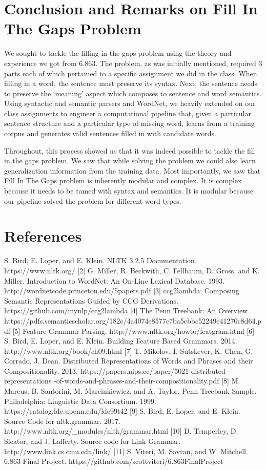 \documentclass{article}[12pt]
\theoremstyle{definition}
\begin{document}
\section{Conclusion and Remarks on Fill In The Gaps Problem}

We sought to tackle the filling in the gaps problem using the theory and experience we got from 6.863. The problem, as was initially mentioned, required 3 parts each of which pertained to a specific assignment we did in the class. When filling in a word, the sentence must preserve its syntax. Next, the sentence needs to preserve the `meaning' aspect which composes to sentence and word semantics. Using syntactic and semantic parsers and WordNet, we heavily extended on our class assignments to engineer a computational pipeline that, given a particular sentence structure and a particular type of missing word, learns from a training corpus and generates valid sentences filled in with candidate words. 

Throughout, this process showed us that it was indeed possible to tackle the fill in the gaps problem. We saw that while solving the problem we could also learn generalization information from the training data. Most importantly, we saw that Fill In The Gaps problem is inherently modular and complex. It is complex because it needs to be tamed with syntax and semantics. It is modular because our pipeline solved the problem for different word types.    

\newpage
\section{References}

\begin{spverbatim}
[1] S. Bird, E. Loper, and E. Klein. NLTK 3.2.5 Documentation. https://www.nltk.org/
[2] G. Miller, R. Beckwith, C. Fellbaum, D. Gross, and K. Miller. 
    Introduction to WordNet: An On-Line Lexical Database. 1993. 
    http://wordnetcode.princeton.edu/5papers.pdf 
[3] ccg2lambda: Composing Semantic Representations Guided by CCG Derivations. 
    https://github.com/mynlp/ccg2lambda
[4] The Penn Treebank: An Overview
https://pdfs.semanticscholar.org/182c/4a4074e8577c7ba5cbbc52249e41270c8d64.pdf
[5] Feature Grammar Parsing. http://www.nltk.org/howto/featgram.html
[6] S. Bird, E. Loper, and E. Klein. Building Feature Based Grammars. 
    2014. http://www.nltk.org/book/ch09.html
[7] T. Mikolov, I. Sutskever, K. Chen, G. Corrado, J. Dean. 
    Distributed Representations of Words and Phrases and their Compositionality. 
    2013. https://papers.nips.cc/paper/5021-distributed-representations
    -of-words-and-phrases-and-their-compositionality.pdf 
[8] M. Marcus, B. Santorini, M. Marcinkiewicz, and A. Taylor. Penn Treebank Sample. 
    Philadelphia: Linguistic Data Consortium. 1999. https://catalog.ldc.upenn.edu/ldc99t42
[9] S. Bird, E. Loper, and E. Klein. Source Code for nltk.grammar. 
    2017. http://www.nltk.org/_modules/nltk/grammar.html
[10] D. Temperley, D. Sleator, and J. Lafferty. Source code for Link Grammar. 
http://www.link.cs.cmu.edu/link/
[11] S. Viteri, M. Savran, and W. Mitchell. 6.863 Final Project.
https://github.com/scottviteri/6.863FinalProject
\end{spverbatim}
\end{document}
